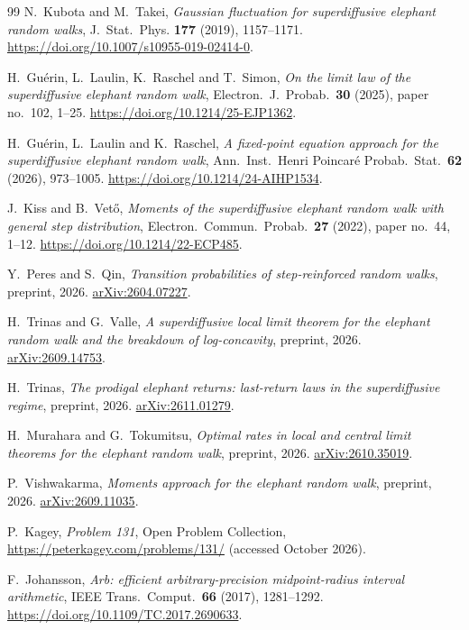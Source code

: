 \begin{thebibliography}{99}
N.~Kubota and M.~Takei, \emph{Gaussian fluctuation for superdiffusive
elephant random walks}, J.~Stat.~Phys. \textbf{177} (2019), 1157--1171.
\url{https://doi.org/10.1007/s10955-019-02414-0}.

H.~Gu\'erin, L.~Laulin, K.~Raschel and T.~Simon, \emph{On the limit law of
the superdiffusive elephant random walk}, Electron.\ J.\ Probab.\
\textbf{30} (2025), paper no.~102, 1--25. \url{https://doi.org/10.1214/25-EJP1362}.

H.~Gu\'erin, L.~Laulin and K.~Raschel, \emph{A fixed-point equation approach
for the superdiffusive elephant random walk}, Ann.\ Inst.\ Henri Poincar\'e
Probab.\ Stat.\ \textbf{62} (2026), 973--1005.
\url{https://doi.org/10.1214/24-AIHP1534}.

J.~Kiss and B.~Vet\H{o}, \emph{Moments of the superdiffusive elephant
random walk with general step distribution}, Electron.\ Commun.\ Probab.\
\textbf{27} (2022), paper no.~44, 1--12.
\url{https://doi.org/10.1214/22-ECP485}.

Y.~Peres and S.~Qin, \emph{Transition probabilities of step-reinforced
random walks}, preprint, 2026.
\href{https://arxiv.org/abs/2604.07227}{arXiv:2604.07227}.

H.~Trinas and G.~Valle, \emph{A superdiffusive local limit theorem for the
elephant random walk and the breakdown of log-concavity}, preprint, 2026.
\href{https://arxiv.org/abs/2609.14753}{arXiv:2609.14753}.

H.~Trinas, \emph{The prodigal elephant returns: last-return laws in the
superdiffusive regime}, preprint, 2026.
\href{https://arxiv.org/abs/2611.01279}{arXiv:2611.01279}.

H.~Murahara and G.~Tokumitsu, \emph{Optimal rates in local and central limit
theorems for the elephant random walk}, preprint, 2026.
\href{https://arxiv.org/abs/2610.35019}{arXiv:2610.35019}.

P.~Vishwakarma, \emph{Moments approach for the elephant random walk},
preprint, 2026.
\href{https://arxiv.org/abs/2609.11035}{arXiv:2609.11035}.

P.~Kagey, \emph{Problem 131}, Open Problem Collection,
\url{https://peterkagey.com/problems/131/} (accessed October 2026).

\bibitem{johansson2017}
F.~Johansson, \emph{Arb: efficient arbitrary-precision midpoint-radius
interval arithmetic}, IEEE Trans.\ Comput.\ \textbf{66} (2017), 1281--1292.
\url{https://doi.org/10.1109/TC.2017.2690633}.


\end{thebibliography}
